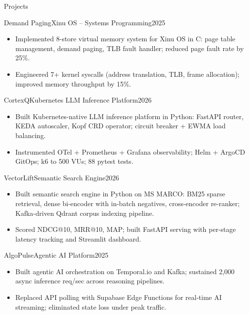 \documentclass[]{mcdowellcv}
\begin{document}
\begin{cvsection}{Projects}
  \begin{cvsubsection}{Demand Paging}{Xinu OS -- Systems Programming}{2025}
    \begin{itemize}
      \item Implemented 8-store virtual memory system for Xinu OS in C: page table management, demand paging, TLB fault handler; reduced page fault rate by 25\%.
      \item Engineered 7+ kernel syscalls (address translation, TLB, frame allocation); improved memory throughput by 15\%.
    \end{itemize}
    \vspace{-1.5pt}
  \end{cvsubsection}

  \begin{cvsubsection}{CortexQ}{Kubernetes LLM Inference Platform}{2026}
    \begin{itemize}
      \item Built Kubernetes-native LLM inference platform in Python: FastAPI router, KEDA autoscaler, Kopf CRD operator; circuit breaker + EWMA load balancing.
      \item Instrumented OTel + Prometheus + Grafana observability; Helm + ArgoCD GitOps; k6 to 500 VUs; 88 pytest tests.
    \end{itemize}
    \vspace{-1.5pt}
  \end{cvsubsection}

  \begin{cvsubsection}{VectorLift}{Semantic Search Engine}{2026}
    \begin{itemize}
      \item Built semantic search engine in Python on MS MARCO: BM25 sparse retrieval, dense bi-encoder with in-batch negatives, cross-encoder re-ranker; Kafka-driven Qdrant corpus indexing pipeline.
      \item Scored NDCG@10, MRR@10, MAP; built FastAPI serving with per-stage latency tracking and Streamlit dashboard.
    \end{itemize}
    \vspace{-1.5pt}
  \end{cvsubsection}

  \begin{cvsubsection}{AlgoPulse}{Agentic AI Platform}{2025}
    \begin{itemize}
      \item Built agentic AI orchestration on Temporal.io and Kafka; sustained 2,000 async inference req/sec across reasoning pipelines.
      \item Replaced API polling with Supabase Edge Functions for real-time AI streaming; eliminated state loss under peak traffic.
    \end{itemize}
  \end{cvsubsection}
\end{cvsection}
\end{document}
